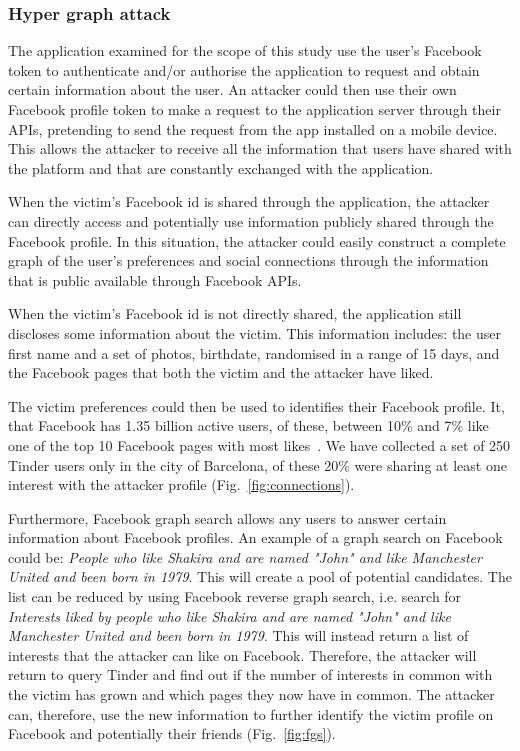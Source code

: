 \subsubsection{Hyper graph attack}
\noindent
The application examined for the scope of this study use the user's Facebook token to authenticate and/or authorise the application to request and obtain certain information about the user.
An attacker could then use their own Facebook profile token to make a request to the application server through their APIs, pretending to send the request from the app installed on a mobile device. This allows the attacker to receive all the information that users have shared with the platform and that are constantly exchanged with the application.

When the victim's Facebook id is shared through the application, the attacker can directly access and potentially use information publicly shared through the Facebook profile. In this situation, the attacker could easily construct a complete graph of the user's preferences and social connections through the information that is public available through Facebook APIs.

When the victim's Facebook id is not directly shared, the application still discloses some information about the victim. This information includes: the user first name and a set of photos, birthdate, randomised in a range of 15 days, and the Facebook pages that both the victim and the attacker have liked.

The victim preferences could then be used to identifies their Facebook profile. It,  that Facebook has 1.35 billion active users, of these, between 10\% and 7\% like one of the top 10 Facebook pages with most likes~\cite{pagedata}. We have collected a set of 250 Tinder users only in the city of Barcelona, of these 20\% were sharing at least one interest with the attacker profile (Fig.~\ref{fig:connections}).

Furthermore, Facebook graph search allows any users to answer certain information about Facebook profiles. An example of a graph search on Facebook could be: \emph{People who like Shakira and are named "John" and like Manchester United and been born in 1979}. This will create a pool of potential candidates. The list can be reduced by using Facebook reverse graph search, i.e. search for \emph{Interests liked by people who like Shakira and are named "John" and like Manchester United and been born in 1979}.  This will instead return a list of interests that the attacker can like on Facebook. Therefore, the attacker will return to query Tinder and find out if the number of interests in common with the victim has grown and which pages they now have in common. The attacker can, therefore, use the new information to further identify the victim profile on Facebook and potentially their friends (Fig.~\ref{fig:fgs}).

